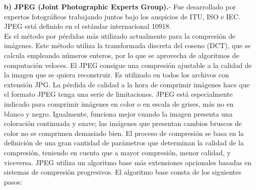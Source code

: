 \documentclass[12pt,letterpaper,titlepage]{article}
\begin{document}
\begin{itemize}
\begin{itemize}
\textbf{ b) JPEG (Joint Photographic Experts Group).}- Fue desarrollado por expertos fotográficos trabajando juntos bajo los auspicios de ITU, ISO e IEC. JPEG está definido en el estándar internacional 10918.\\
Es el método por pérdidas más utilizado actualmente para la compresión de imágenes. Este método utiliza la transformada discreta del coseno (DCT), que se calcula empleando números enteros, por lo que se aprovecha de algoritmos de computación veloces. El JPEG consigue una compresión ajustable a la calidad de la imagen que se quiera reconstruir. Es utilizado en todos los archivos con extensión JPG. La pérdida de calidad a la hora de comprimir imágenes hace que el formato JPEG tenga una serie de limitaciones. JPEG está especialmente indicado para comprimir imágenes en color o en escala de grises, más no en blanco y negro. Igualmente, funciona mejor cuando la imagen presenta una coloración continuada y suave; las imágenes que presentan cambios bruscos de color no se comprimen demasiado bien. El proceso de compresión se basa en la definición de una gran cantidad de parámetros que determinan la calidad de la compresión, teniendo en cuenta que a mayor compresión, menor calidad, y viceversa. JPEG utiliza un algoritmo base más extensiones opcionales basadas en sistemas de compresión progresivos. El algoritmo base consta de los siguientes pasos:



\end{itemize}
\end{itemize}
\end{document}
